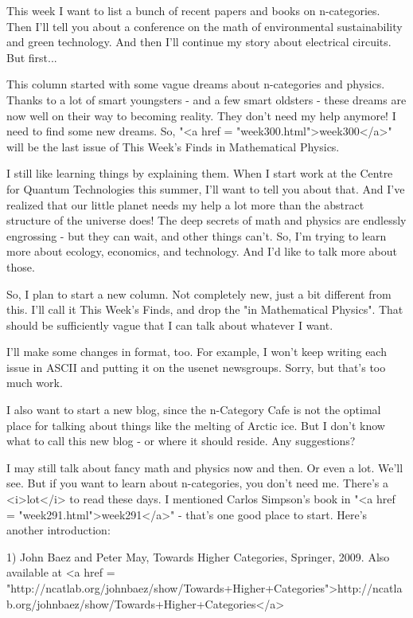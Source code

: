 

This week I want to list a bunch of recent papers and books on
n-categories.  Then I'll tell you about a conference on the math of
environmental sustainability and green technology.  And then I'll
continue my story about electrical circuits.  But first...

This column started with some vague dreams about n-categories and
physics.  Thanks to a lot of smart youngsters - and a few smart
oldsters - these dreams are now well on their way to becoming reality.
They don't need my help anymore!  I need to find some new dreams.  So,
"<a href = "week300.html">week300</a>" will be the last
issue of This Week's Finds in Mathematical Physics.

I still like learning things by explaining them.  When I start work at
the Centre for Quantum Technologies this summer, I'll want to tell you
about that.  And I've realized that our little planet needs my help a
lot more than the abstract structure of the universe does!  The deep
secrets of math and physics are endlessly engrossing - but they can
wait, and other things can't.  So, I'm trying to learn more about ecology, 
economics, and technology.  And I'd like to talk more about those.

So, I plan to start a new column.  Not completely new, just a bit
different from this.  I'll call it This Week's Finds, and drop the
"in Mathematical Physics".  That should be sufficiently
vague that I can talk about whatever I want.

I'll make some changes in format, too.  For example, I won't keep
writing each issue in ASCII and putting it on the usenet newsgroups.
Sorry, but that's too much work.

I also want to start a new blog, since the n-Category Cafe is not the
optimal place for talking about things like the melting of Arctic ice.
But I don't know what to call this new blog - or where it should
reside.  Any suggestions?

I may still talk about fancy math and physics now and then.  Or even a
lot.  We'll see.  But if you want to learn about n-categories, you don't
need me.  There's a <i>lot</i> to read these days.  I mentioned Carlos 
Simpson's book in "<a href = "week291.html">week291</a>" - 
that's one good place to start.  Here's another introduction:

1) John Baez and Peter May, Towards Higher Categories, Springer, 2009.
Also available at <a href = "http://ncatlab.org/johnbaez/show/Towards+Higher+Categories">http://ncatlab.org/johnbaez/show/Towards+Higher+Categories</a>

